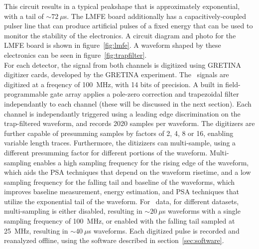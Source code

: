 \documentclass[/main.tex]{subfiles}
\begin{document}
This circuit results in a typical peakshape that is approximately exponential, with a tail of $\sim72~\mu$s.
The LMFE board additionally has a capacitively-coupled pulser line that can produce artificial pulses of a fixed energy that can be used to monitor the stability of the electronics.
A circuit diagram and photo for the LMFE board is shown in figure~\ref{fig:lmfe}.
A waveform shaped by these electronics can be seen in figure~\ref{fig:trapfilter}.
\\
For each detector, the signal from both channels is digitized using GRETINA digitizer cards, developed by the GRETINA experiment\cite{zimmermann2012}.
The \MJD\ signals are digitized at a freqency of 100~MHz, with 14 bits of precision.
A built in field-programmable gate array applies a pole-zero correction and trapezoidal filter independantly to each channel (these will be discussed in the next section).
Each channel is independantly triggered using a leading edge discrimination on the trap-filtered waveform, and records 2020 samples per waveform.
The digitizers are further capable of presumming samples by factors of 2, 4, 8 or 16, enabling variable length traces.
Furthermore, the ditizizers can multi-sample, using a different presumming factor for different portions of the waveform.
Multi-sampling enables a high sampling frequency for the rising edge of the waveform, which aids the PSA techniques that depend on the waveform risetime, and a low sampling frequency for the falling tail and baseline of the waveforms, which improves baseline measurement, energy estimation, and PSA techniques that utilize the exponential tail of the waveform.
For \MJD\ data, for different datasets, multi-sampling is either disabled, resulting in $\sim20~\mu$s waveforms with a single sampling frequency of 100~MHz, or enabled with the falling tail sampled at 25~MHz, resulting in $\sim40~\mu$s waveforms.
Each digitized pulse is recorded and reanalyzed offline, using the software described in section~\ref{sec:software}.
\\
\end{document}
